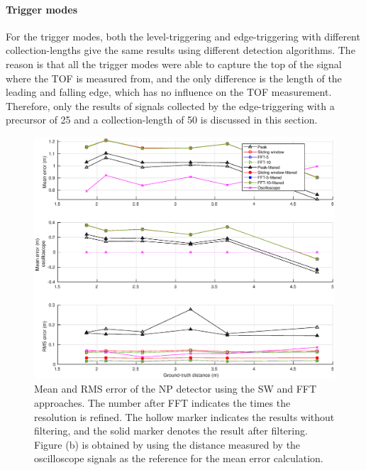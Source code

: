 \paragraph{Trigger modes}
For the trigger modes, both the level-triggering and edge-triggering with different collection-lengths give the same results using different detection algorithms. The reason is that all the trigger modes were able to capture the top of the signal where the TOF is measured from, and the only difference is the length of the leading and falling edge, which has no influence on the TOF measurement. Therefore, only the results of signals collected by the edge-triggering with a precursor of 25 and a collection-length of 50 is discussed in this section.\par
\begin{figure}[t!p]
\centering
\includegraphics[width=1\textwidth]{figures/chapter_ADC_MF/Error_dist_all_FFT_real.eps}
\caption{Mean and RMS error of the NP detector using the SW and FFT approaches. The number after FFT indicates the times the resolution is refined. The hollow marker indicates the results without filtering, and the solid marker denotes the result after filtering. Figure (b) is obtained by using the distance measured by the oscilloscope signals as the reference for the mean error calculation.}
\label{fig:error_NP_real}
\end{figure}



